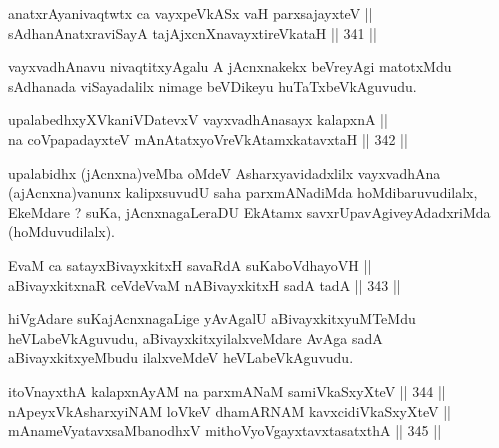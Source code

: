 
\begin{shl}
anatxrAyanivaqtwtx ca vayxpeVkASx vaH parxsajayxteV ||  \\
sAdhanAnatxraviSayA tajAjxcnXnavayxtireVkataH ||  341 ||  
\end{shl}

\begin{artha}
vayxvadhAnavu nivaqtitxyAgalu A jAcnxnakekx beVreyAgi matotxMdu
sAdhanada viSayadalilx nimage beVDikeyu huTaTxbeVkAguvudu.
\end{artha}

\begin{shl}
\footnotemark[1]upalabedhxyXVkaniVDatevxV vayxvadhAnasayx kalapxnA || \\
na coVpapadayxteV mAnAtatxyoVreVkAtamxkatavxtaH ||  342 ||  
\end{shl}

\begin{artha}
upalabidhx (jAcnxna)veMba oMdeV Asharxyavidadxlilx
vayxvadhAna (ajAcnxna)vanunx kalipxsuvudU saha parxmANadiMda hoMdibaruvudilalx, EkeMdare ? suKa, jAcnxnagaLeraDU EkAtamx
savxrUpavAgiveyAdadxriMda (hoMduvudilalx).
\end{artha}


\begin{shl}
EvaM ca satayxBivayxkitxH savaRdA suKaboVdhayoVH || \\
aBivayxkitxnaR ceVdeVvaM nABivayxkitxH sadA tadA ||  343 ||  
\end{shl}

\begin{artha}
hiVgAdare suKajAcnxnagaLige yAvAgalU aBivayxkitxyuMTeMdu
heVLabeVkAguvudu, aBivayxkitxyilalxveMdare AvAga sadA
aBivayxkitxyeMbudu ilalxveMdeV heVLabeVkAguvudu.
\end{artha}

\begin{shl}
itoV\s nayxthA kalapxnAyAM na parxmANaM samiVkaSxyXteV ||  344 ||  \\
nApeyxVkAsharxyiNAM loVkeV dhamARNAM kavxcidiVkaSxyXteV || \\
mAnameVyatavxsaMbanodhxV mithoVyoVgayxtavxtasatxthA ||  345 ||  
\end{shl}

